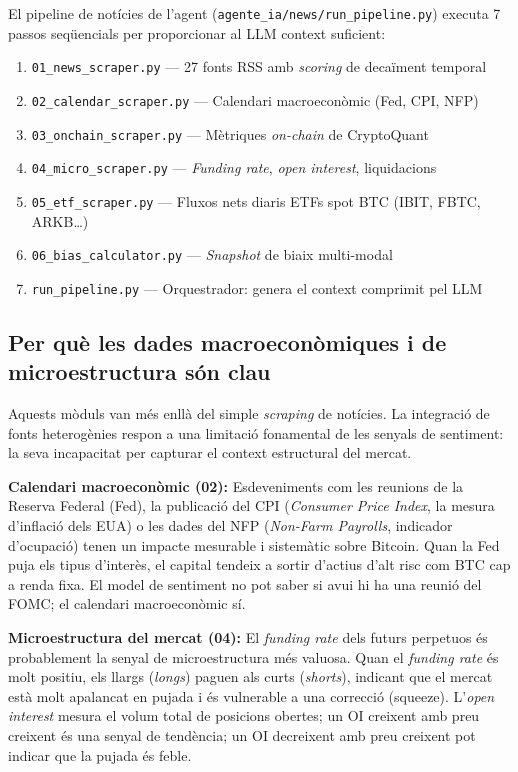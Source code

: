 \documentclass[12pt, a4paper]{report}
\begin{document}
El pipeline de notícies de l'agent (\texttt{agente\_ia/news/run\_pipeline.py}) executa 7 passos seqüencials per proporcionar al LLM context suficient:

\begin{enumerate}
  \item \texttt{01\_news\_scraper.py} --- 27 fonts RSS amb \textit{scoring} de decaïment temporal
  \item \texttt{02\_calendar\_scraper.py} --- Calendari macroeconòmic (Fed, CPI, NFP)
  \item \texttt{03\_onchain\_scraper.py} --- Mètriques \textit{on-chain} de CryptoQuant
  \item \texttt{04\_micro\_scraper.py} --- \textit{Funding rate}, \textit{open interest}, liquidacions
  \item \texttt{05\_etf\_scraper.py} --- Fluxos nets diaris ETFs spot BTC (IBIT, FBTC, ARKB\ldots)
  \item \texttt{06\_bias\_calculator.py} --- \textit{Snapshot} de biaix multi-modal
  \item \texttt{run\_pipeline.py} --- Orquestrador: genera el context comprimit pel LLM
\end{enumerate}

\subsection{Per què les dades macroeconòmiques i de microestructura són clau}

Aquests mòduls van més enllà del simple \textit{scraping} de notícies. La integració de fonts heterogènies respon a una limitació fonamental de les senyals de sentiment: la seva incapacitat per capturar el context estructural del mercat.

\textbf{Calendari macroeconòmic (02):} Esdeveniments com les reunions de la Reserva Federal (Fed), la publicació del CPI (\textit{Consumer Price Index}, la mesura d'inflació dels EUA) o les dades del NFP (\textit{Non-Farm Payrolls}, indicador d'ocupació) tenen un impacte mesurable i sistemàtic sobre Bitcoin. Quan la Fed puja els tipus d'interès, el capital tendeix a sortir d'actius d'alt risc com BTC cap a renda fixa. El model de sentiment no pot saber si avui hi ha una reunió del FOMC; el calendari macroeconòmic sí.

\textbf{Microestructura del mercat (04):} El \textit{funding rate} dels futurs perpetuos és probablement la senyal de microestructura més valuosa. Quan el \textit{funding rate} és molt positiu, els llargs (\textit{longs}) paguen als curts (\textit{shorts}), indicant que el mercat està molt apalancat en pujada i és vulnerable a una correcció (squeeze). L'\textit{open interest} mesura el volum total de posicions obertes; un OI creixent amb preu creixent és una senyal de tendència; un OI decreixent amb preu creixent pot indicar que la pujada és feble.
\end{document}
